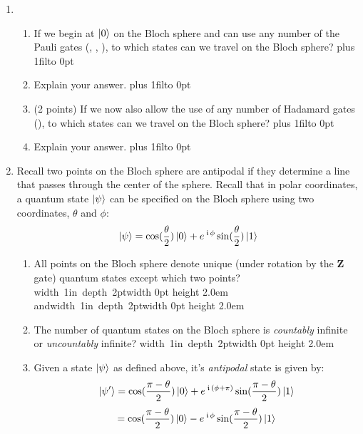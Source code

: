 \documentclass[12pt]{article}
\newcommand{\Blank}{\mbox{\hskip 4pt\vrule width 1in depth 2pt}\vrule width 0pt height 2.0em}
\def\DefaultSpace{1in}
\newcommand{\LeaveSpace}[1][\DefaultSpace]{%
\vskip #1 plus 1fil\relax\hbox to 0pt{\hss} %
}
\begin{document}
\begin{enumerate}[font=\bfseries]
\begin{enumerate}[label=\theenumi.\arabic*]
        \item {} If $a,b,c$ are all even what is the probability of observing $\ket{1}$ when we measure $\ket{\psi}$? \Blank{}
    \end{enumerate}
    \item {}
    \begin{enumerate}[label=\theenumi.\arabic*] \item {} If we begin at $\ket{0}$ on the Bloch sphere and can use any number of the Pauli gates (\PauliX{}, \PauliY{}, \PauliZ{}), to which states can we travel on the Bloch sphere? \LeaveSpace{}
    \item {} Explain your answer. 
    \LeaveSpace{}
    
    \item (2 points) If we now also allow the use of any number of Hadamard gates (\Hadamard{}), to which states can we travel on the Bloch sphere? \LeaveSpace{}
    \item {} Explain your answer. 
    \LeaveSpace{}
    \end{enumerate}
    \item {} Recall two points on the Bloch sphere are antipodal if they determine a line that passes through the center of the sphere. Recall that in polar coordinates, a quantum state $\ket{\psi}$ can be specified on the Bloch sphere using two coordinates, $\theta$ and $\phi$:
    \[\ket{\psi} = \cos(\frac{\theta}{2})\ket{0}
    + e^{\,\kern 0.5pt\mathfrak{i}\,\phi}\sin(\frac{\theta}{2})\ket{1}\]
    \begin{enumerate}[label=\theenumi.\arabic*]
        \item {} All points on the Bloch sphere denote unique (under rotation by the $\mathbf{Z}$ gate) quantum states except which two points? \Blank{} and\Blank{}
        \item {} The number of quantum states on the Bloch sphere is \emph{countably} infinite or \emph{uncountably} infinite? \Blank{}
        \item {} Given a state $\ket{\psi}$ as defined above, it's \emph{antipodal} state is given by:
        \[ \ket{\psi'} = \cos({\frac{\pi - \theta}{2})\ket{0}+e^{\,\kern 0.5pt\mathfrak{i}\,(\phi + \pi)}\sin({\frac{\pi - \theta}{2}})\ket{1}}
        \]
        \[
        = \cos({\frac{\pi - \theta}{2})\ket{0}-e^{\,\kern 0.5pt\mathfrak{i}\,\phi}\sin({\frac{\pi - \theta}{2}})\ket{1}}
        \]
        

\end{enumerate}
\end{enumerate}
\end{document}
